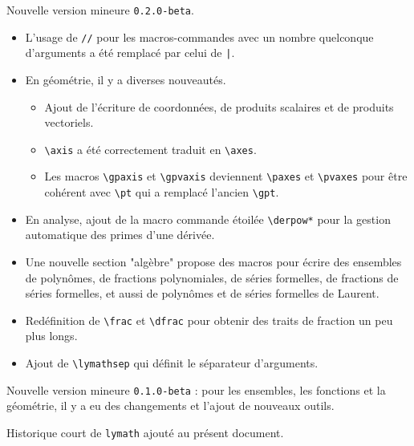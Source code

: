 \documentclass[12pt,a4paper]{article}
\theoremstyle{definition}
\begin{document}
\begin{description}[leftmargin=1em]

    \item[2019-02-21] Nouvelle version mineure \verb+0.2.0-beta+.
    \begin{itemize}
        \item L'usage de \verb+//+ pour les macros-commandes avec un nombre quelconque d'arguments a été remplacé par celui de \verb+|+.

        \item En géométrie, il y a diverses nouveautés.
        \begin{itemize}
            \item Ajout de l'écriture de coordonnées, de produits scalaires et de produits vectoriels.

            \item \verb+\axis+ a été correctement traduit en \verb+\axes+.

            \item Les macros \verb+\gpaxis+ et \verb+\gpvaxis+ deviennent \verb+\paxes+ et \verb+\pvaxes+ pour être cohérent avec \verb+\pt+ qui a remplacé l'ancien \verb+\gpt+.
        \end{itemize}

        \item En analyse, ajout de la macro commande étoilée \verb+\derpow*+ pour la gestion automatique des primes d'une dérivée.

        \item Une nouvelle section "algèbre" propose des macros pour écrire des ensembles de polynômes, de fractions polynomiales, de séries formelles, de fractions de séries formelles, et aussi de polynômes et de séries formelles de Laurent.

        \item Redéfinition de \verb+\frac+ et \verb+\dfrac+ pour obtenir des traits de fraction un peu plus longs.

        \item Ajout de \verb+\lymathsep+ qui définit le séparateur d'arguments.
    \end{itemize}


    \item[2017-11-01] Nouvelle version mineure \verb+0.1.0-beta+ : pour les ensembles, les fonctions et la géométrie, il y a eu des changements et l'ajout de nouveaux outils.


    \item[2017-10-21] Historique court de \verb+lymath+ ajouté au présent document.


\end{description}
\end{document}
